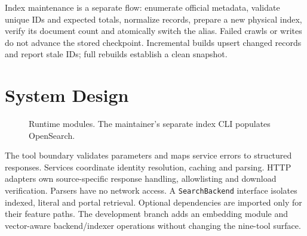 \documentclass[a4paper,12pt]{report}
\newcommand{\tuik}{T\"U\.{I}K}
\newcommand{\code}[1]{\texttt{\small #1}}
\begin{document}
Index maintenance is a separate flow: enumerate official metadata, validate unique IDs and expected totals, normalize records, prepare a new physical index, verify its document count and atomically switch the alias. Failed crawls or writes do not advance the stored checkpoint. Incremental builds upsert changed records and report stale IDs; full rebuilds establish a clean snapshot.

\section{System Design}
\begin{figure}[H]
\centering
\begingroup\renewcommand{\baselinestretch}{1}\selectfont
{}
\endgroup
\caption{Runtime modules. The maintainer's separate index CLI populates OpenSearch.}
\label{fig:architecture}
\end{figure}

The tool boundary validates parameters and maps service errors to structured responses. Services coordinate identity resolution, caching and parsing. HTTP adapters own source-specific response handling, allowlisting and download verification. Parsers have no network access. A \code{SearchBackend} interface isolates indexed, literal and portal retrieval. Optional dependencies are imported only for their feature paths. The development branch adds an embedding module and vector-aware backend/indexer operations without changing the nine-tool surface.
\end{document}
